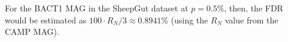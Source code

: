 For the BACT1 MAG in the SheepGut dataset at $p = 0.5\%$, then, the FDR would be estimated as $100 \cdot R_N / 3 \approx 0.8941\%$ (using the $R_N$ value from the CAMP MAG).\endinput